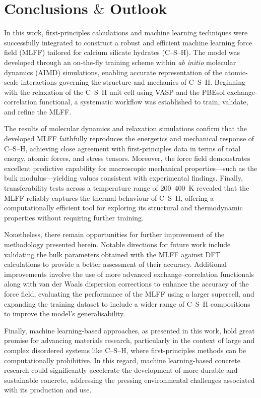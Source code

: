 \chapter{\texorpdfstring{Conclusions $\&$ Outlook}{Conclusions \& Outlook}} %

\label{Chapter5} %

In this work, first-principles calculations and machine learning techniques were successfully integrated to construct a robust and efficient machine learning force field (MLFF) tailored for calcium silicate hydrates (C--S--H). The model was developed through an on-the-fly training scheme within \emph{ab initio} molecular dynamics (AIMD) simulations, enabling accurate representation of the atomic-scale interactions governing the structure and mechanics of C--S--H. Beginning with the relaxation of the C--S--H unit cell using VASP and the PBEsol exchange-correlation functional, a systematic workflow was established to train, validate, and refine the MLFF.

The results of molecular dynamics and relaxation simulations confirm that the developed MLFF faithfully reproduces the energetics and mechanical response of C--S--H, achieving close agreement with first-principles data in terms of total energy, atomic forces, and stress tensors. Moreover, the force field demonstrates excellent predictive capability for macroscopic mechanical properties—such as the bulk modulus---yielding values consistent with experimental findings. Finally, transferability tests across a temperature range of 200--400~K revealed that the MLFF reliably captures the thermal behaviour of C--S--H, offering a computationally efficient tool for exploring its structural and thermodynamic properties without requiring further training.


Nonetheless, there remain opportunities for further improvement of the methodology presented herein. Notable directions for future work include validating the bulk parameters obtained with the MLFF against DFT calculations to provide a better assessment of their accuracy. Additional improvements involve the use of more advanced exchange–correlation functionals along with van der Waals dispersion corrections to enhance the accuracy of the force field, evaluating the performance of the MLFF using a larger supercell, and expanding the training dataset to include a wider range of C--S--H compositions to improve the model's generalisability.

Finally, machine learning-based approaches, as presented in this work, hold great promise for advancing materials research, particularly in the context of large and complex disordered systems like C--S--H, where first-principles methods can be computationally prohibitive. In this regard, machine learning-based concrete research could significantly accelerate the development of more durable and sustainable concrete, addressing the pressing environmental challenges associated with its production and use.



